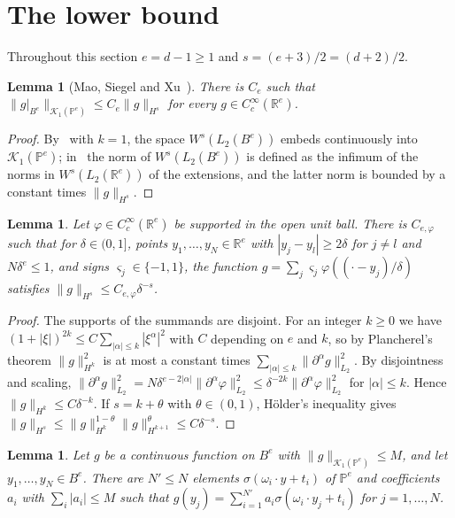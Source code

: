 \documentclass[11pt]{amsart}
\newtheorem{lemma}[theorem]{Lemma}
\theoremstyle{definition}
\theoremstyle{remark}
\numberwithin{equation}{section}
\newcommand{\RR}{\mathbb{R}}
\newcommand{\cP}{\mathbb{P}}
\begin{document}
\section{The lower bound}\label{sec:lower}

Throughout this section $e=d-1\ge1$ and $s=(e+3)/2=(d+2)/2$.

\begin{lemma}[Mao, Siegel and Xu~\cite{MSX}]\label{lem:embed}
There is $C_e$ such that $\|g|_{B^e}\|_{\mathcal K_1(\cP^e)}\le C_e\|g\|_{H^s}$ for every $g\in C_c^\infty(\RR^e)$.
\end{lemma}

\begin{proof}
By~\cite[Theorem~1]{MSX} with $k=1$, the space $W^s(L_2(B^e))$ embeds continuously into $\mathcal K_1(\cP^e)$; in~\cite{MSX} the norm of $W^s(L_2(B^e))$ is defined as the infimum of the norms in $W^s(L_2(\RR^e))$ of the extensions, and the latter norm is bounded by a constant times $\|g\|_{H^s}$.
\end{proof}

\begin{lemma}\label{lem:bumps}
Let $\varphi\in C_c^\infty(\RR^e)$ be supported in the open unit ball. There is $C_{e,\varphi}$ such that for $\delta\in(0,1]$, points $y_1,\dots,y_N\in\RR^e$ with $|y_j-y_l|\ge2\delta$ for $j\ne l$ and $N\delta^e\le1$, and signs $\varsigma_j\in\{-1,1\}$, the function $g=\sum_j\varsigma_j\varphi((\cdot-y_j)/\delta)$ satisfies $\|g\|_{H^s}\le C_{e,\varphi}\delta^{-s}$.
\end{lemma}

\begin{proof}
The supports of the summands are disjoint. For an integer $k\ge0$ we have $(1+|\xi|)^{2k}\le C\sum_{|\alpha|\le k}|\xi^\alpha|^2$ with $C$ depending on $e$ and $k$, so by Plancherel's theorem $\|g\|_{H^k}^2$ is at most a constant times $\sum_{|\alpha|\le k}\|\partial^\alpha g\|_{L_2}^2$. By disjointness and scaling, $\|\partial^\alpha g\|_{L_2}^2=N\delta^{e-2|\alpha|}\|\partial^\alpha\varphi\|_{L_2}^2\le\delta^{-2k}\|\partial^\alpha\varphi\|_{L_2}^2$ for $|\alpha|\le k$. Hence $\|g\|_{H^k}\le C\delta^{-k}$. If $s=k+\theta$ with $\theta\in(0,1)$, H\"older's inequality gives $\|g\|_{H^s}\le\|g\|_{H^k}^{1-\theta}\|g\|_{H^{k+1}}^{\theta}\le C\delta^{-s}$.
\end{proof}

\begin{lemma}\label{lem:finite}
Let $g$ be a continuous function on $B^e$ with $\|g\|_{\mathcal K_1(\cP^e)}\le M$, and let $y_1,\dots,y_N\in B^e$. There are $N'\le N$ elements $\sigma(\omega_i\cdot y+t_i)$ of $\cP^e$ and coefficients $a_i$ with $\sum_i|a_i|\le M$ such that $g(y_j)=\sum_{i=1}^{N'}a_i\sigma(\omega_i\cdot y_j+t_i)$ for $j=1,\dots,N$.
\end{lemma}
\end{document}
